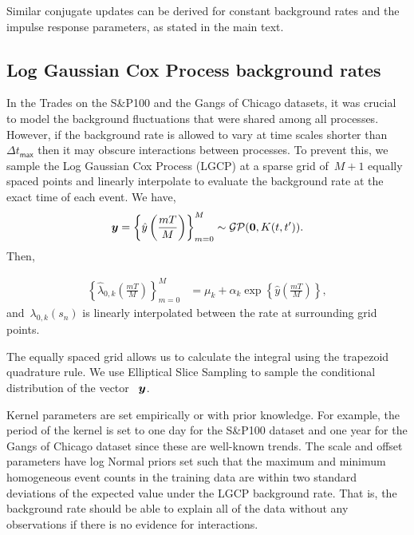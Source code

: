 Similar conjugate updates can be derived for constant background rates and the impulse response parameters, as stated in the main text.

\subsection{Log Gaussian Cox Process background rates}
In the Trades on the S\&P100 and the Gangs of Chicago datasets, it was crucial to model the background fluctuations that were shared among all processes. However, if the background rate is allowed to vary at time scales shorter than~${\Delta t_{\textsf{max}}}$ then it may obscure interactions between processes. To prevent this, we sample the Log Gaussian Cox Process (LGCP) at a sparse grid of~$M+1$ equally spaced points and linearly interpolate to evaluate the background rate at the exact time of each event. We have,
\begin{align*}
\boldsymbol{y}=\left\{\hat{y}\left(\frac{mT}{M}\right)\right\}_{m=0}^M \sim \mathcal{GP}(\boldsymbol{0},K(t,t')).
\end{align*}
Then,

\begin{align*}
\left\{\hat{\lambda}_{0,k}\left(\frac{mT}{M}\right)\right\}_{m=0}^M &= \mu_k + \alpha_k\exp\left\{\hat{y}\left(\frac{mT}{M}\right)\right\},
\end{align*}
and~${\lambda_{0,k}(s_n)}$ is linearly interpolated between the rate at surrounding grid points.

The equally spaced grid allows us to calculate the integral using the trapezoid quadrature rule. We use Elliptical Slice Sampling \cite{Murray-2010} to sample the conditional distribution of the vector ~$\boldsymbol{y}$.

Kernel parameters are set empirically or with prior knowledge. For example, the period of the kernel is set to one day for the S\&P100 dataset and one year for the Gangs of Chicago dataset since these are well-known trends. The scale and offset parameters have log Normal priors set such that the maximum and minimum homogeneous event counts in the training data are within two standard deviations of the expected value under the LGCP background rate. That is, the background rate should be able to explain all of the data without any observations if there is no evidence for interactions.

